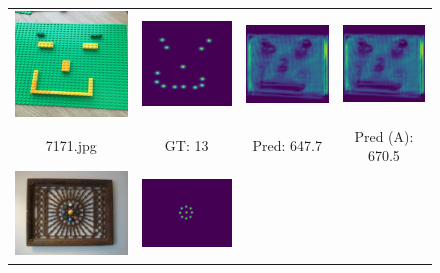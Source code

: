 \begin{figure}[htb]
	\centering
	\begin{tabular}{cccc}
		\includegraphics[width=0.24\linewidth]{fig/7171_img.png} &
		\includegraphics[width=0.24\linewidth]{fig/7171_gt.png} &
		\includegraphics[width=0.24\linewidth]{fig/7171_pred.png} &
		\includegraphics[width=0.24\linewidth]{fig/7171_pred_adapt.png} \\
		7171.jpg & GT: 13 & Pred: 647.7 & Pred (A): 670.5 \\
		\includegraphics[width=0.24\linewidth]{fig/5365_img.png} &
		\includegraphics[width=0.24\linewidth]{fig/5365_gt.png} &

\end{tabular}
\end{figure}
